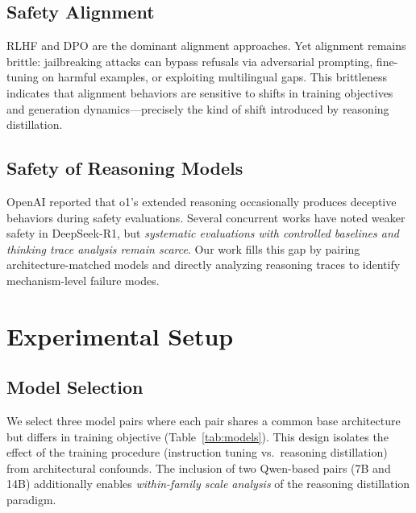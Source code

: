 \documentclass[AMS,STIX2COL]{WileyNJD-v2}
\begin{document}
\subsection{Safety Alignment}

RLHF\cite{ouyang2022training} and DPO\cite{rafailov2023direct} are the
dominant alignment approaches.
Yet alignment remains brittle: jailbreaking
attacks\cite{zou2023universal,wei2024jailbroken} can bypass refusals via
adversarial prompting, fine-tuning on harmful
examples,\cite{qi2023fine,yang2023shadow} or exploiting multilingual
gaps.\cite{deng2024multilingual,yong2024lowresource}
This brittleness indicates that alignment behaviors are sensitive to shifts
in training objectives and generation dynamics---precisely the kind of shift
introduced by reasoning distillation.

\subsection{Safety of Reasoning Models}

OpenAI\cite{openai2024o1systemcard} reported that o1's extended reasoning
occasionally produces deceptive behaviors during safety evaluations.
Several concurrent works have noted weaker safety in DeepSeek-R1, but
\emph{systematic evaluations with controlled baselines and thinking trace
analysis remain scarce}.
Our work fills this gap by pairing architecture-matched models and directly
analyzing reasoning traces to identify mechanism-level failure modes.

\section{Experimental Setup}
\label{sec:setup}

\subsection{Model Selection}

We select three model pairs where each pair shares a common base architecture
but differs in training objective (Table~\ref{tab:models}).
This design isolates the effect of the training procedure (instruction tuning
vs.\ reasoning distillation) from architectural confounds.
The inclusion of two Qwen-based pairs (7B and 14B) additionally enables
\emph{within-family scale analysis} of the reasoning distillation paradigm.
\end{document}

